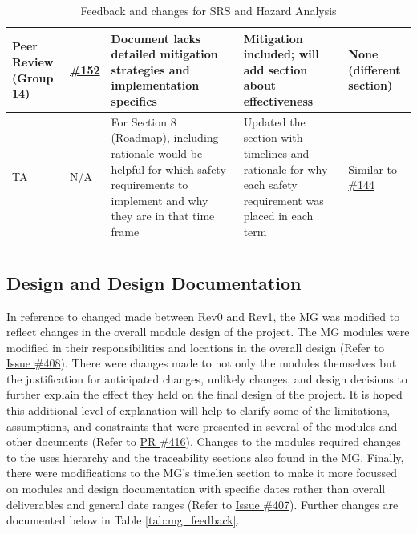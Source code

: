 \documentclass{article}
\begin{document}
{\begin{xltabular}{\textwidth}{>{\raggedright\arraybackslash}X >{\raggedright\arraybackslash}p{0.8cm} >{\raggedright\arraybackslash}X >{\raggedright\arraybackslash}X >{\raggedright\arraybackslash}p{2.0cm}}
\midrule
Peer Review (Group 14) & \href{https://github.com/M9Huynh/technically-functional/issues/152}{\#152} & Document lacks detailed mitigation strategies and implementation specifics & Mitigation included; will add section about effectiveness & None (different section) \\
\midrule
TA & N/A & For Section 8 (Roadmap), including rationale would be helpful for which safety requirements to implement and why they are in that time frame & Updated the section with timelines and rationale for why each safety requirement was placed in each term & Similar to \href{https://github.com/M9Huynh/technically-functional/issues/144}{\#144} \\
\bottomrule
\caption{Feedback and changes for SRS and Hazard Analysis}
\label{tab:hazard_feedback}
\end{xltabular}
}
\subsection{Design and Design Documentation}

In reference to changed made between Rev0 and Rev1, the MG was modified to reflect changes in the overall module design of the project. The MG modules were modified in their responsibilities and locations in the overall design (Refer to \href{https://github.com/M9Huynh/technically-functional/issues/408}{Issue \#408}). There were changes made to not only the modules themselves but the justification for anticipated changes, unlikely changes, and design decisions to further explain the effect they held on the final design of the project. It is hoped this additional level of explanation will help to clarify some of the limitations, assumptions, and constraints that were presented in several of the modules and other documents (Refer to \href{https://github.com/M9Huynh/technically-functional/pull/416}{PR \#416}). Changes to the modules required changes to the uses hierarchy and the traceability sections also found in the MG. Finally, there were modifications to the MG's timelien section to make it more focussed on modules and design documentation with specific dates rather than overall deliverables and general date ranges (Refer to \href{https://github.com/M9Huynh/technically-functional/issues/407}{Issue \#407}). Further changes are documented below in Table \ref{tab:mg_feedback}.
\end{document}

